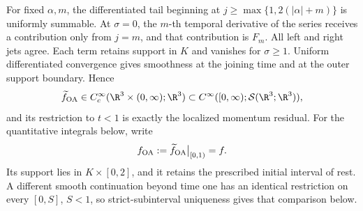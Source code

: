 For fixed \(\alpha,m\), the differentiated tail beginning at
\(j\ge\max\{1,2(|\alpha|+m)\}\) is uniformly summable. At
\(\sigma=0\), the \(m\)-th temporal derivative of the series receives a
contribution only from \(j=m\), and that contribution is \(F_m\). All left
and right jets agree. Each term retains support in \(K\) and vanishes for
\(\sigma\ge1\). Uniform differentiated convergence gives smoothness at the
joining time and at the outer support boundary. Hence
\begin{equation}
 \widetilde f_{\rm OA}\in
 C_c^\infty(\R^3\times(0,\infty);\R^3)
 \subset C^\infty([0,\infty);\mathcal S(\R^3;\R^3)),
 \label{r:eq:oa-force-class}
\end{equation}
and its restriction to \(t<1\) is exactly the localized momentum residual.
For the quantitative integrals below, write
\begin{equation}
 f_{\rm OA}:=\widetilde f_{\rm OA}\big|_{[0,1)}=f.
 \label{r:eq:oa-force-restriction}
\end{equation}
Its support lies in \(K\times[0,2]\), and it retains the prescribed initial
interval of rest. A different smooth continuation beyond time one has an identical restriction on every \([0,S]\), \(S<1\), so strict-subinterval
uniqueness gives that comparison below.
